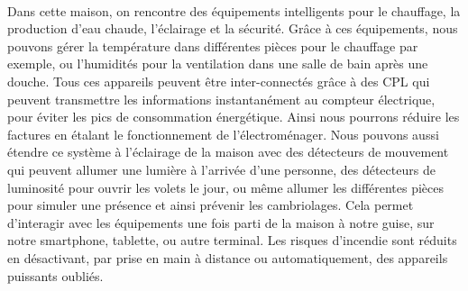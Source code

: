             \paragraph{}
Dans cette maison, on rencontre des équipements intelligents pour le chauffage, la production d’eau chaude, l’éclairage et la sécurité.
Grâce à ces équipements, nous pouvons gérer la température dans différentes pièces pour le chauffage par exemple, ou l'humidités pour la ventilation dans une salle de bain après une douche.
Tous ces appareils peuvent être inter-connectés grâce à des CPL qui peuvent transmettre les informations instantanément au compteur électrique, pour éviter les pics de consommation énergétique.
Ainsi nous pourrons réduire les factures en étalant le fonctionnement de l'électroménager.
Nous pouvons aussi étendre ce système à l’éclairage de la maison avec des détecteurs de mouvement qui peuvent allumer une lumière à l’arrivée d’une personne,
des détecteurs de luminosité pour ouvrir les volets le jour, ou même allumer les différentes pièces pour simuler une présence et ainsi prévenir les cambriolages.
Cela permet d'interagir avec les équipements une fois parti de la maison à notre guise, sur notre smartphone, tablette, ou autre terminal.
Les risques d’incendie sont réduits en désactivant, par prise en main à distance ou automatiquement, des appareils puissants oubliés.
            \paragraph{}



